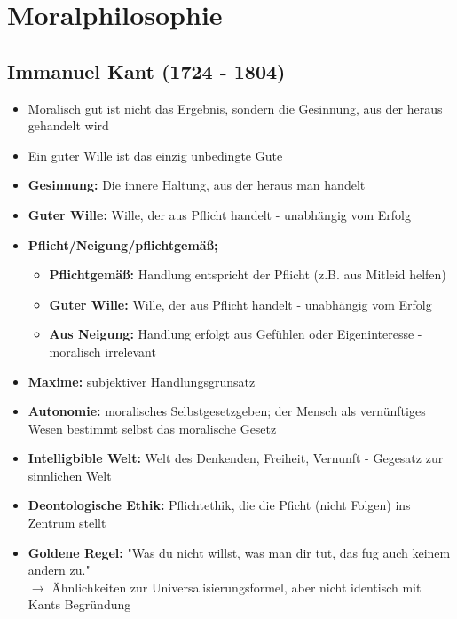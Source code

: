 
\section{Moralphilosophie}


\subsection{Immanuel Kant (1724 - 1804)}
\begin{itemize}
    \item Moralisch gut ist nicht das Ergebnis, sondern die Gesinnung, aus der heraus gehandelt wird
    \item Ein guter Wille ist das einzig unbedingte Gute
\end{itemize}

\begin{itemize}
    \item \textbf{Gesinnung:} Die innere Haltung, aus der heraus man handelt
    \item \textbf{Guter Wille:} Wille, der aus Pflicht handelt - unabhängig vom Erfolg
    \item \textbf{Pflicht/Neigung/pflichtgemäß;}
    \begin{itemize}
        \item \textbf{Pflichtgemäß:} Handlung entspricht der Pflicht (z.B. aus Mitleid helfen)
        \item \textbf{Guter Wille:} Wille, der aus Pflicht handelt - unabhängig vom Erfolg
        \item \textbf{Aus Neigung:} Handlung erfolgt aus Gefühlen oder Eigeninteresse - moralisch irrelevant
    \end{itemize}
    \item \textbf{Maxime:} subjektiver Handlungsgrunsatz
    \item \textbf{Autonomie:} moralisches Selbstgesetzgeben; der Mensch als vernünftiges Wesen bestimmt selbst das moralische Gesetz
    \item \textbf{Intelligbible Welt:} Welt des Denkenden, Freiheit, Vernunft - Gegesatz zur sinnlichen Welt
    \item \textbf{Deontologische Ethik:} Pflichtethik, die die Pficht (nicht Folgen) ins Zentrum stellt
    \item \textbf{Goldene Regel:} "Was du nicht willst, was man dir tut, das fug auch keinem andern zu." \\
    $\rightarrow$ Ähnlichkeiten zur Universalisierungsformel, aber nicht identisch mit Kants Begründung
\end{itemize}

